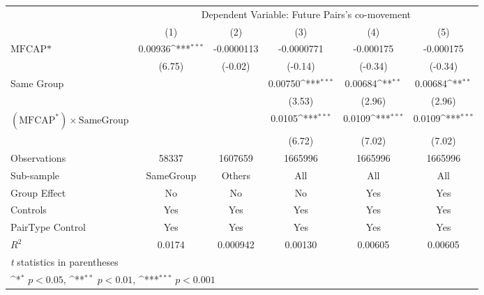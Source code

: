 {
\def\sym#1{\ifmmode^{#1}\else\(^{#1}\)\fi}
\begin{tabular}{l*{5}{c}}
\hline\hline
                &\multicolumn{5}{c}{Dependent Variable: Future Pairs's co-movement}                            \\\cmidrule(lr){2-6}
                &\multicolumn{1}{c}{(1)}         &\multicolumn{1}{c}{(2)}         &\multicolumn{1}{c}{(3)}         &\multicolumn{1}{c}{(4)}         &\multicolumn{1}{c}{(5)}         \\
\hline
$ \text{MFCAP*} $&  0.00936\sym{***}&-0.0000113         &-0.0000771         &-0.000175         &-0.000175         \\
                &   (6.75)         &  (-0.02)         &  (-0.14)         &  (-0.34)         &  (-0.34)         \\
[1em]
Same Group      &                  &                  &  0.00750\sym{***}&  0.00684\sym{**} &  0.00684\sym{**} \\
                &                  &                  &   (3.53)         &   (2.96)         &   (2.96)         \\
[1em]
 $ (\text{MFCAP}^*) \times {\text{SameGroup} }  $ &                  &                  &   0.0105\sym{***}&   0.0109\sym{***}&   0.0109\sym{***}\\
                &                  &                  &   (6.72)         &   (7.02)         &   (7.02)         \\
\hline
Observations    &    58337         &  1607659         &  1665996         &  1665996         &  1665996         \\
Sub-sample      &SameGroup         &   Others         &      All         &      All         &      All         \\
Group Effect    &       No         &       No         &       No         &      Yes         &      Yes         \\
Controls        &      Yes         &      Yes         &      Yes         &      Yes         &      Yes         \\
PairType Control&      Yes         &      Yes         &      Yes         &      Yes         &      Yes         \\
$ R^2 $         &   0.0174         & 0.000942         &  0.00130         &  0.00605         &  0.00605         \\
\hline\hline
\multicolumn{6}{l}{\footnotesize \textit{t} statistics in parentheses}\\
\multicolumn{6}{l}{\footnotesize \sym{*} \(p<0.05\), \sym{**} \(p<0.01\), \sym{***} \(p<0.001\)}\\
\end{tabular}
}

